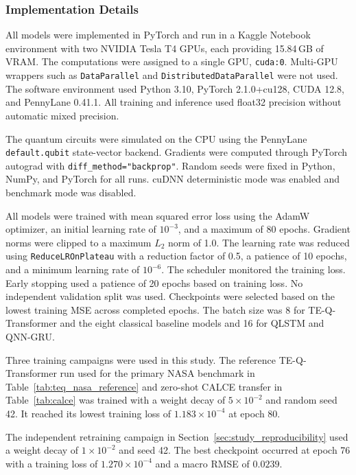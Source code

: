 \documentclass[a4paper,fleqn]{cas-sc}
\begin{document}
\subsubsection{Implementation Details}\label{sec:implementation_details}

All models were implemented in PyTorch and run in a Kaggle Notebook environment with two NVIDIA Tesla T4 GPUs, each providing 15.84\,GB of VRAM. The computations were assigned to a single GPU, \texttt{cuda:0}. Multi-GPU wrappers such as \texttt{DataParallel} and \texttt{DistributedDataParallel} were not used. The software environment used Python 3.10, PyTorch 2.1.0+cu128, CUDA 12.8, and PennyLane 0.41.1. All training and inference used float32 precision without automatic mixed precision.

The quantum circuits were simulated on the CPU using the PennyLane \texttt{default.qubit} state-vector backend. Gradients were computed through PyTorch autograd with \texttt{diff\_method="backprop"}. Random seeds were fixed in Python, NumPy, and PyTorch for all runs. cuDNN deterministic mode was enabled and benchmark mode was disabled.

All models were trained with mean squared error loss using the AdamW optimizer, an initial learning rate of $10^{-3}$, and a maximum of 80 epochs. Gradient norms were clipped to a maximum $L_2$ norm of 1.0. The learning rate was reduced using \texttt{ReduceLROnPlateau} with a reduction factor of 0.5, a patience of 10 epochs, and a minimum learning rate of $10^{-6}$. The scheduler monitored the training loss. Early stopping used a patience of 20 epochs based on training loss. No independent validation split was used. Checkpoints were selected based on the lowest training MSE across completed epochs. The batch size was 8 for TE-Q-Transformer and the eight classical baseline models and 16 for QLSTM and QNN-GRU.

Three training campaigns were used in this study. The reference TE-Q-Transformer run used for the primary NASA benchmark in Table~\ref{tab:teq_nasa_reference} and zero-shot CALCE transfer in Table~\ref{tab:calce} was trained with a weight decay of $5\times 10^{-2}$ and random seed 42. It reached its lowest training loss of $1.183\times 10^{-4}$ at epoch 80.

The independent retraining campaign in Section~\ref{sec:study_reproducibility} used a weight decay of $1\times 10^{-2}$ and seed 42. The best checkpoint occurred at epoch 76 with a training loss of $1.270\times 10^{-4}$ and a macro RMSE of $0.0239$.
\end{document}

